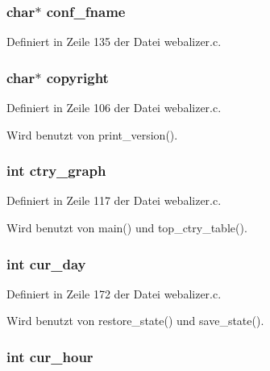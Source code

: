 \subsubsection{\setlength{\rightskip}{0pt plus 5cm}char$\ast$ {\bf conf\_\-fname}}\label{webalizer_8h_cdbdc13e07422e1c556c3eda55c593c2}




Definiert in Zeile 135 der Datei webalizer.c.
\subsubsection{\setlength{\rightskip}{0pt plus 5cm}char$\ast$ {\bf copyright}}\label{webalizer_8h_38852561a5fe1b90c4dae9d90b83a80a}




Definiert in Zeile 106 der Datei webalizer.c.

Wird benutzt von print\_\-version().
\subsubsection{\setlength{\rightskip}{0pt plus 5cm}int {\bf ctry\_\-graph}}\label{webalizer_8h_f1ef30cbdcfd1e369800371e296aaec2}




Definiert in Zeile 117 der Datei webalizer.c.

Wird benutzt von main() und top\_\-ctry\_\-table().
\subsubsection{\setlength{\rightskip}{0pt plus 5cm}int {\bf cur\_\-day}}\label{webalizer_8h_6edfa42467177fc02002d61038a98f39}




Definiert in Zeile 172 der Datei webalizer.c.

Wird benutzt von restore\_\-state() und save\_\-state().
\subsubsection{\setlength{\rightskip}{0pt plus 5cm}int {\bf cur\_\-hour}}\label{webalizer_8h_ae0bcd47798b959a96cb28082a0f151b}




